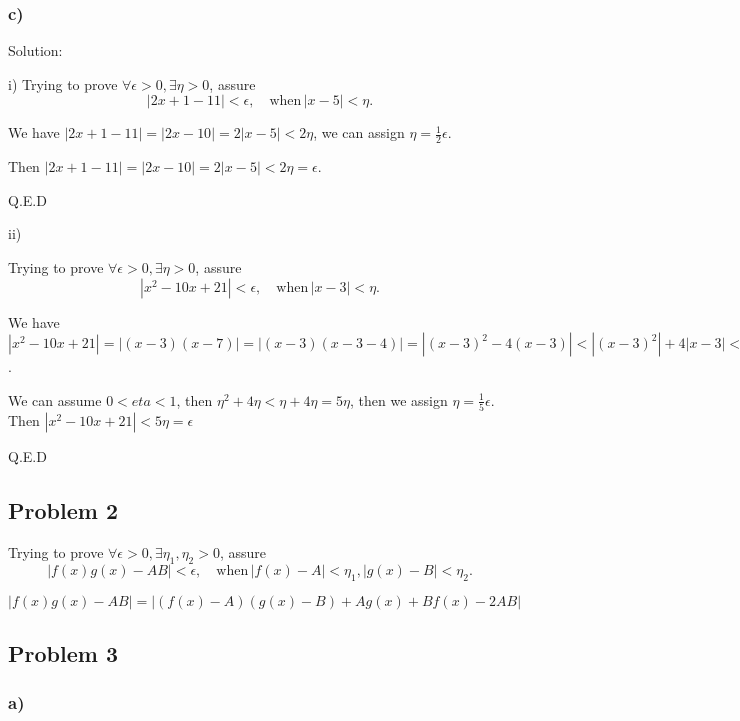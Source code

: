 \documentclass[letterpaper, 11pt]{article}
\newcommand{\1}{\mathds{1}}	%
\theoremstyle{definition}
\begin{document}
  \subsubsection*{c)}

  Solution:

  i)
  Trying to prove $ \forall \epsilon > 0, \exists \eta > 0$, assure \begin{equation*}
    |2x+1-11| < \epsilon,\quad \text{when}\, |x - 5| < \eta.
  \end{equation*}

  We have $|2x+1-11| = |2x-10|=2|x-5| < 2 \eta $,
  we can assign $\eta = \frac{1}{2} \epsilon$.

  Then $|2x+1-11| = |2x-10|=2|x-5| < 2 \eta = \epsilon$.

  Q.E.D

  ii)

  Trying to prove $ \forall \epsilon > 0, \exists \eta > 0$, assure \begin{equation*}
    |x^{2} - 10x + 21| < \epsilon,\quad \text{when}\, |x - 3| < \eta.
  \end{equation*}

  We have $|x^{2} - 10x + 21| = |(x-3)(x-7)|=|(x-3)(x-3-4)| = |(x-3)^{2} - 4(x-3)| < |(x-3)^{2}| + 4 |x-3| < \eta ^{2} + 4 \eta $.

  We can assume $0 < eta < 1$, then $\eta ^{2} + 4 \eta < \eta + 4\eta = 5\eta$, then we assign $\eta = \frac{1}{5}\epsilon$.
  Then $|x^{2} - 10x + 21| < 5\eta = \epsilon$

  Q.E.D

  \subsection*{Problem 2}
  Trying to prove $ \forall \epsilon > 0, \exists \eta_{1}, \eta_{2} > 0$, assure \begin{equation*}
    |f(x)g(x) - AB| < \epsilon,\quad \text{when}\, |f(x) - A| < \eta_{1} , |g(x) - B| < \eta_{2}.
  \end{equation*}

$|f(x)g(x) - AB| = | (f(x) - A)(g(x) - B) + A g(x) + B f(x) - 2AB |$



  \subsection*{Problem 3}

  \subsubsection*{a)}
\end{document}
